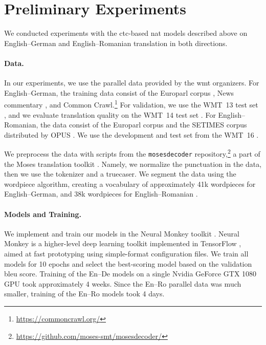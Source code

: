 \section{Preliminary Experiments}%
\label{sec:ctc:experiments}

We conducted experiments with the \ac{ctc}-based \ac{nat} models described
above on English--German and English--Romanian translation in both directions.

\paragraph{Data.}
In our experiments, we use the parallel data provided by the \ac{wmt}
organizers. For English--German, the training data consist of the Europarl
corpus \citep{koehn-2005-europarl}, News commentary
\citep{tiedemann-2012-parallel}, and Common
Crawl.\footnote{\url{https://commoncrawl.org/}} For validation, we use the
WMT~13 test set \citep{bojar-etal-2013-findings}, and we evaluate translation
quality on the WMT~14 test set \citep{bojar-etal-2014-findings}. For
English--Romanian, the data consist of the Europarl corpus and the SETIMES
corpus distributed by OPUS \citep{tiedemann-2012-parallel}. We use the
development and test set from the WMT~16 \citep{bojar-etal-2016-findings}.

We preprocess the data with scripts from the \texttt{mosesdecoder}
repository,\footnote{\url{https://github.com/moses-smt/mosesdecoder/}} a part
of the Moses translation toolkit \citep{koehn-etal-2007-moses}. Namely, we
normalize the punctuation in the data, then we use the tokenizer and a
truecaser. We segment the data using the wordpiece algorithm, creating a
vocabulary of approximately 41k wordpieces for English--German, and 38k
wordpieces for English--Romanian \citep{wu2016google}.

\paragraph{Models and Training.}
We implement and train our models in the Neural Monkey toolkit
\citep{helcl-libovicky-2017-neural,helcl-etal-2018-neural}. Neural Monkey is a
higher-level deep learning toolkit implemented in TensorFlow
\citep{tensorflow2015-whitepaper}, aimed at fast prototyping using
simple-format configuration files. We train all models for 10 epochs and select
the best-scoring model based on the validation \acs{bleu} score. Training of
the En--De models on a single Nvidia GeForce GTX 1080 GPU took approximately 4
weeks. Since the En--Ro parallel data was much smaller, training of the En--Ro
models took 4 days.


